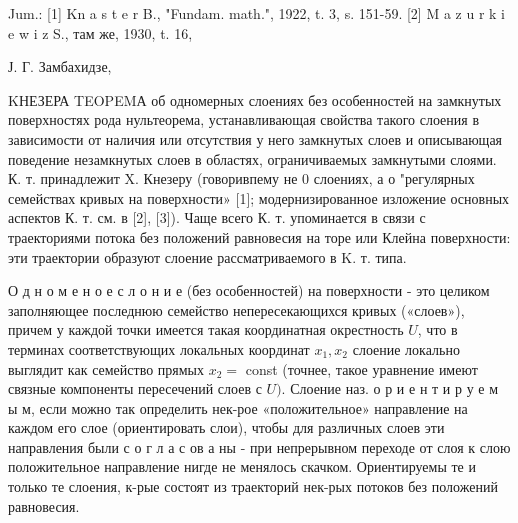 \documentclass[10pt]{article}
\begin{document}
Jum.: [1] Kn a s t e r B., "Fundam. math.", 1922, t. 3, s. 151-59. [2] M a z u r k i e w i z S., там же, 1930, t. 16,

Ј. Г. Замбахидзе,



KНЕЗЕРА TEOPEMА об одномерных слоениях без особенностей на замкнутых поверхностях рода нультеорема, устанавливающая свойства такого слоения в зависимости от наличия или отсутствия у него замкнутых слоев и описывающая поведение незамкнутых слоев в областях, ограничиваемых замкнутыми слоями. К. т. принадлежит X. Кнезеру (говоривпему не 0 слоениях, а о "регулярных семействах кривых на поверхности» [1]; модернизированное изложение основных аспектов К. т. см. в [2], [3]). Чаще всего К. т. упоминается в связи с траекториями потока без положений равновесия на торе или Клейна поверхности: эти траектории образуют слоение рассматриваемого в K. т. типа.



О д н о м е н о е с л о н и е (без особенностей) на поверхности - это целиком заполняющее последнюю семейство непересекающихся кривых («слоев»), причем у каждой точки имеется такая координатная окрестность $U$, что в терминах соответствующих локальных координат $x_{1}, x_{2}$ слоение локально выглядит как семейство прямых $x_{2}=$ const (точнее, такое уравнение имеют связные компоненты пересечений слоев с $U)$. Слоение наз. о р и е н т и р у е м ы м, если можно так определить нек-рое «положительное» направление на каждом его слое (ориентировать слои), чтобы для различных слоев эти направления были с о г л а с ов а ны - при непрерывном переходе от слоя к слою положительное направление нигде не менялось скачком. Ориентируемы те и только те слоения, к-рые состоят из траекторий нек-рых потоков без положений равновесия.
\end{document}
